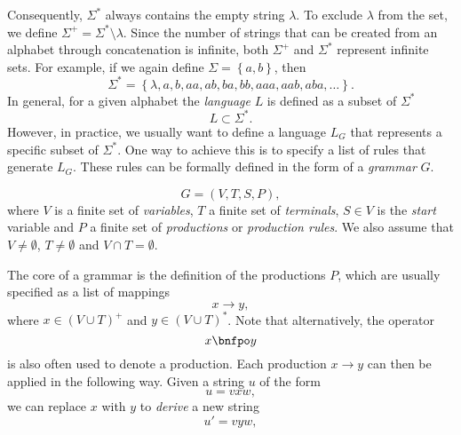 Consequently, $\Sigma^*$ always contains the empty string $\lambda$.
To exclude $\lambda$ from the set, we define $\Sigma^+ = \Sigma^* \setminus \lambda$.
Since the number of strings that can be created from an alphabet through concatenation is infinite, both $\Sigma^+$ and $\Sigma^*$ represent infinite sets.
For example, if we again define $\Sigma = \left\{a, b\right\}$, then
\begin{equation*}
	\Sigma^{*} = \left\{\lambda, a, b, aa, ab, ba, bb, aaa, aab, aba, \dots \right\}.
\end{equation*} 
In general, for a given alphabet the \emph{language} $L$ is defined as a subset of $\Sigma^*$
\begin{equation}
	L \subset \Sigma^*.
	\label{eq:language-basic-definition}
\end{equation}
However, in practice, we usually want to define a language $L_G$ that represents a specific subset of $\Sigma^*$.
One way to achieve this is to specify a list of rules that generate $L_G$.
These rules can be formally defined in the form of a \emph{grammar} $G$.
\begin{definition}[Grammar]
	\begin{equation}
		G = \left(V, T, S, P \right),
	\end{equation}
	where $V$ is a finite set of \emph{variables},
	$T$ a finite set of \emph{terminals},
	$S \in V$ is the \emph{start} variable and 
	$P$ a finite set of \emph{productions} or \emph{production rules}.
	We also assume that $V \neq \emptyset$, $T \neq \emptyset$ and $V \cap T = \emptyset$.
\end{definition}
The core of a grammar is the definition of the productions $P$, which are usually specified as a list of mappings
\begin{equation*}
	x \to y,
	\label{eq:unrestricted-production}
\end{equation*}
where $x \in \left(V \cup T\right)^+$ and $y \in \left(V \cup T\right)^*$.
Note that alternatively, the operator
\begin{equation*}
	x \bnfpo y
\end{equation*}
is also often used to denote a production.
Each production $x \to y$ can then be applied in the following way.
Given a string $u$ of the form 
\begin{equation*}
	u = vxw,
\end{equation*}
we can replace $x$ with $y$ to \emph{derive} a new string
\begin{equation}
	u' = vyw,
\end{equation}
